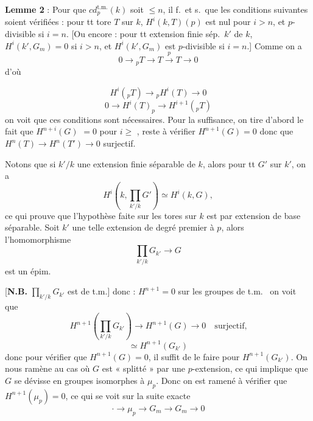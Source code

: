 \documentclass[11pt,a4paper]{article}
\begin{document}
\textbf{Lemme 2} : Pour que $cd_p^{\text{t.m.}}(k)$ soit $\leqslant n$, il
f.\ et s.\ que les conditions suivantes soient vérifiées : pour tt tore $T$
sur $k$, $H^i(k,T)(p)$ est nul pour $i > n$, et $p$-divisible si $i = n$.
[Ou encore : pour tt extension finie sép.\ $k'$ de $k$, \ill{}
 $H^i(k', G_m) = 0$ si $i > n$, et
$H^i(k', G_m)$ est $p$-divisible si $i = n$.]
Comme on a
\[
0 \longrightarrow {}_{p}T \longrightarrow T \xrightarrow{\;p\;} T \longrightarrow 0
\]
d'où 

\[
H^i({}_pT) \longrightarrow {}_pH^i(T) \longrightarrow 0
\]
\[
0 \longrightarrow H^i(T)_p \longrightarrow H^{i+1}({}_pT)
\]
on voit que ces conditions sont nécessaires. Pour la suffisance, on tire
d'abord le fait que $H^{n+i}(G)$ \struck{\ill{}} $= 0$ pour $i \geqslant$
, reste à vérifier $H^{n+1}(G) = 0$ donc que
$H^n(T) \longrightarrow H^n(T') \longrightarrow 0$ surjectif.
 \struck{\ill{}}

Notons que si $k'/k$ une extension finie séparable de $k$, alors pour tt
$G'$ sur $k'$, on a
\[
H^i(k, \textstyle\prod_{k'/k} G') \simeq H^i(k, G),
\]
ce qui prouve que l'hypothèse faite sur les tores sur $k$ est
 par extension de base séparable. Soit $k'$ une telle
extension de degré premier à $p$, alors l'homomorphisme 
\[
\textstyle\prod_{k'/k} G_{k'} \longrightarrow G
\]
est  un épim.

[\textbf{N.B.} $\prod_{k'/k} G_{k'}$ est de t.m.] donc \ill{} :
$H^{n+1} = 0$ sur les groupes de t.m.\ \ill{} on voit que
\[
H^{n+1}(\textstyle\prod_{k'/k} G_{k'}) \longrightarrow H^{n+1}(G) \longrightarrow 0
\quad\text{surjectif,}
\]
\[
\simeq H^{n+1}(G_{k'})
\]
donc pour vérifier que $H^{n+1}(G) = 0$, il suffit de le faire pour
$H^{n+1}(G_{k'})$. On nous ramène au cas où $G$ est « splitté » par une
$p$-extension, ce qui implique que $G$ se dévisse en groupes isomorphes à
$\mu_p$. Donc on est ramené à vérifier que $H^{n+1}(\mu_p) = 0$, ce qui se
voit sur la suite exacte
\[
\cdot \longrightarrow \mu_p \longrightarrow G_m \longrightarrow G_m \longrightarrow 0
\]
\end{document}
